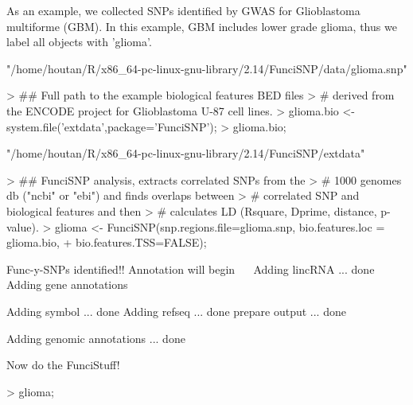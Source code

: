 \documentclass[a4paper]{article}
\begin{document}
As an example, we collected SNPs identified by GWAS for Glioblastoma multiforme 
(GBM). In this example, GBM includes lower grade glioma, thus we label all 
objects with 'glioma'.
\begin{Schunk}
\begin{Soutput}
[1] "/home/houtan/R/x86_64-pc-linux-gnu-library/2.14/FunciSNP/data/glioma.snp"
\end{Soutput}
\begin{Sinput}
> ## Full path to the example biological features BED files 
> #  derived from the ENCODE project for Glioblastoma U-87 cell lines.
> glioma.bio <- system.file('extdata',package='FunciSNP');
> glioma.bio;
\end{Sinput}
\begin{Soutput}
[1] "/home/houtan/R/x86_64-pc-linux-gnu-library/2.14/FunciSNP/extdata"
\end{Soutput}
\begin{Sinput}
> ## FunciSNP analysis, extracts correlated SNPs from the 
> #  1000 genomes db ("ncbi" or "ebi") and finds overlaps between 
> #  correlated SNP and biological features and then 
> #  calculates LD (Rsquare, Dprime, distance, p-value).
> glioma <- FunciSNP(snp.regions.file=glioma.snp, bio.features.loc = glioma.bio, 
+ bio.features.TSS=FALSE);
\end{Sinput}
\begin{Soutput}
Func-y-SNPs identified!!
Annotation will begin
~~
Adding lincRNA ... done
Adding gene annotations

Adding symbol ... done
Adding refseq ... done
prepare output ... done

Adding genomic annotations ... done

Now do the FunciStuff!
\end{Soutput}
\begin{Sinput}
> glioma;
\end{Sinput}
\end{Schunk}
\end{document}
